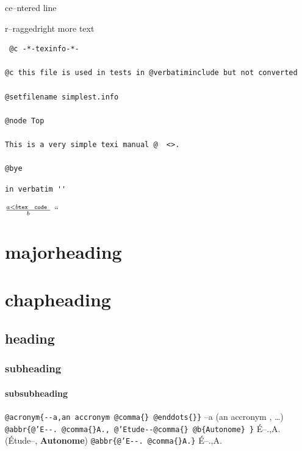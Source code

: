 \documentclass{book}
\newcommand{\Texinfoplaceholder}[1]{}
\newcommand{\Texinfonopagebreakheading}[2]{{\let\clearpage\relax \let\cleardoublepage\relax \let\thispagestyle\Texinfoplaceholder #1{#2}}}
\renewcommand{\_}{\Texinfounderscore\discretionary{}{}{}}
\begin{document}
{\begin{center}
ce--ntered line
\end{center}

\begin{flushleft}
r--raggedright
more text
\end{flushleft}

\begin{verbatim}
 @c -*-texinfo-*-

@c this file is used in tests in @verbatiminclude but not converted

@setfilename simplest.info

@node Top

This is a very simple texi manual @  <>.

@bye
\end{verbatim}

\begin{verbatim}
in verbatim ''
\end{verbatim}





$\frac{a < b \texttt{tex \hbox{ code }}}{b}$ ``

\Texinfonopagebreakheading{\chapter*}{{majorheading}}

\Texinfonopagebreakheading{\chapter*}{{chapheading}}

\section*{{heading}}

\subsection*{{subheading}}

\subsubsection*{{subsubheading}}


\texttt{@acronym\{{-}{-}a,an accronym @comma\{\}\ @enddots\{\}\}} --a (an accronym , \dots{})
\texttt{@abbr\{@'E{-}{-}.\ @comma\{\}A.,\ @'Etude{-}{-}@comma\{\}\ @b\{Autonome\}\ \}} \'{E}--.\@ ,A.\@ (\'{E}tude--, \textbf{Autonome})
\texttt{@abbr\{@'E{-}{-}.\ @comma\{\}A.\}} \'{E}--.\@ ,A.\@

}
\end{document}

